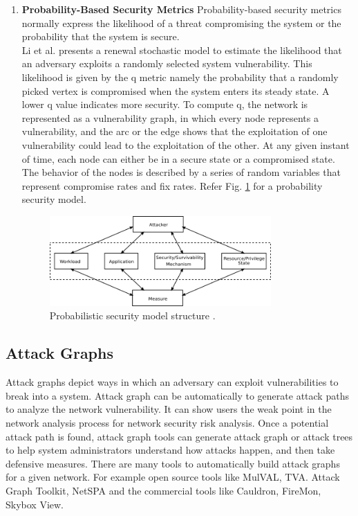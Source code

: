 \documentclass[pdftex,english,oribibl]{llncs}
\begin{document}
\begin{enumerate}[(1)]
{	Even though MTTF provide useful security level information, they do not take into account of partial or interrupted attacks (which can also cause damage to the system).}

	\item {\textbf{Probability-Based Security Metrics}\newline 
	Probability-based security metrics normally express the likelihood of a threat compromising the system or the probability that the system is secure.\\
	
 	Li et al. \cite{4695835_Li} presents a renewal stochastic model to estimate the likelihood that an adversary exploits a randomly selected system vulnerability. This likelihood is given by the q metric namely the probability that a randomly picked vertex is compromised when the system enters its steady state. A lower q value indicates more security. To compute q, the network is represented as a vulnerability graph, in which every node represents a vulnerability, and the arc or the edge shows that the exploitation of one vulnerability could lead to the exploitation of the other. At any given instant of time, each node can either be in a secure state or a compromised state. The behavior of the nodes is described by a series of random variables that represent compromise rates and fix rates. Refer Fig. \ref{fig:probablistic_sec_mod} for a probability security model.}
 	\begin{figure}[h]
 		\centering\includegraphics[width=0.8\textwidth]{figures/probablistic_sec_mod.png}
 		\caption{Probabilistic security model structure \cite{1335467_Nicol}.}
 		\label{fig:probablistic_sec_mod}
 	\end{figure}
\end{enumerate}

\subsection{Attack Graphs}  
Attack graphs depict ways in which an adversary can exploit vulnerabilities to break into a system. Attack graph can be automatically to generate attack paths to analyze the network vulnerability. It can show users the weak point in the network analysis process for network security risk analysis. Once a potential attack path is found, attack graph tools can generate attack graph or attack trees to help system administrators understand how attacks happen, and then take defensive measures. There are many tools to automatically build attack graphs for a given network. For example open source tools like MulVAL, TVA. Attack Graph Toolkit, NetSPA and the commercial tools like Cauldron, FireMon, Skybox View.
\end{document}
